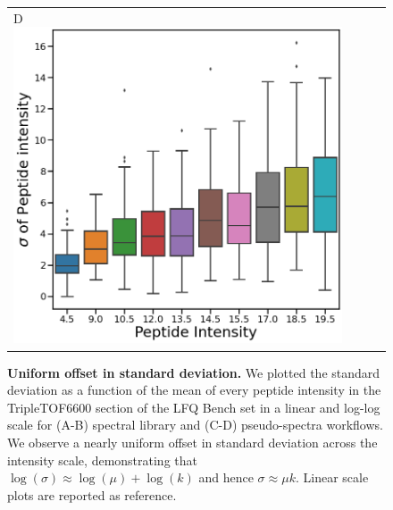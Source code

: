 \documentclass[11pt]{article}
\begin{document}
\begin{figure}[hbt]
\begin{tabular}{lclc}
        D \includegraphics[width=0.5\linewidth]{../../result/mu_sigma_variance_plots/diann/diann_boxplot_nolog_qvalFiltered_pepFiltered_qbinned.png} & \\%
    \end{tabular}
  \caption{{\bf Uniform offset in standard deviation.} We plotted the standard deviation as a function of the mean of every peptide intensity in the TripleTOF6600 section of the LFQ Bench set  in a linear and log-log scale for (A-B) spectral library and (C-D) pseudo-spectra workflows.  We observe a nearly uniform offset in standard deviation across the intensity scale, demonstrating that $\log(\sigma) \approx \log(\mu) + \log(k)$ and hence   $\sigma \approx \mu k$. Linear scale plots are reported as reference.  \label{fig:mu_sigma_boxplot}}
\end{figure}
\end{document}
